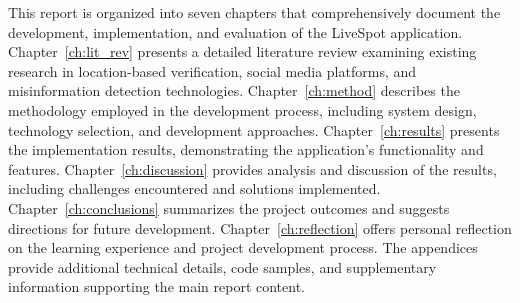 This report is organized into seven chapters that comprehensively document the development, implementation, and evaluation of the LiveSpot application. Chapter~\ref{ch:lit_rev} presents a detailed literature review examining existing research in location-based verification, social media platforms, and misinformation detection technologies. Chapter~\ref{ch:method} describes the methodology employed in the development process, including system design, technology selection, and development approaches. Chapter~\ref{ch:results} presents the implementation results, demonstrating the application's functionality and features. Chapter~\ref{ch:discussion} provides analysis and discussion of the results, including challenges encountered and solutions implemented. Chapter~\ref{ch:conclusions} summarizes the project outcomes and suggests directions for future development. Chapter~\ref{ch:reflection} offers personal reflection on the learning experience and project development process. The appendices provide additional technical details, code samples, and supplementary information supporting the main report content.

